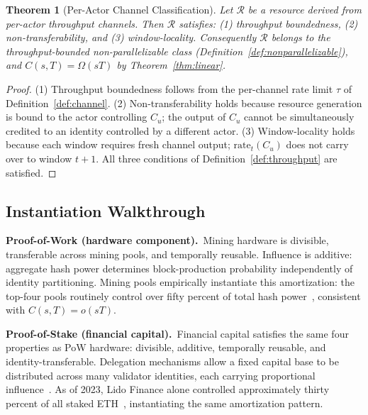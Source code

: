 \documentclass[10pt,journal,compsoc]{IEEEtran}
\newtheorem{theorem}{Theorem}[section]
\theoremstyle{remark}
\begin{document}
	\begin{theorem}[Per-Actor Channel Classification]
		\label{thm:channel}
		Let $\mathcal{R}$ be a resource derived from per-actor
		throughput channels.
		Then $\mathcal{R}$ satisfies:
		(1) throughput boundedness,
		(2) non-transferability, and
		(3) window-locality.
		Consequently $\mathcal{R}$ belongs to the
		throughput-bounded non-parallelizable class
		(Definition~\ref{def:nonparallelizable}), and
		$C(s,T) = \Omega(sT)$ by Theorem~\ref{thm:linear}.
	\end{theorem}
	
	\begin{proof}
		(1) Throughput boundedness follows from the
		per-channel rate limit $\tau$ of
		Definition~\ref{def:channel}.
		(2) Non-transferability holds because resource
		generation is bound to the actor controlling $C_u$;
		the output of $C_u$ cannot be simultaneously
		credited to an identity controlled by a different
		actor.
		(3) Window-locality holds because each window
		requires fresh channel output; $\mathrm{rate}_t(C_u)$
		does not carry over to window $t+1$.
		All three conditions of Definition~\ref{def:throughput}
		are satisfied.
	\end{proof}
	
	\subsection{Instantiation Walkthrough}
	\label{ssec:walkthrough}
	
	\noindent\textbf{Proof-of-Work (hardware component).}\ 
	Mining hardware is divisible, transferable across mining
	pools, and temporally reusable.
	Influence is additive: aggregate hash power determines
	block-production probability independently of identity
	partitioning.
	Mining pools empirically instantiate this amortization:
	the top-four pools routinely control over fifty percent
	of total hash power~\cite{gencer2018decentralization,rosenfeld2011analysis},
	consistent with $C(s,T) = o(sT)$.
	
	\noindent\textbf{Proof-of-Stake (financial capital).}\ 
	Financial capital satisfies the same four properties
	as PoW hardware: divisible, additive, temporally
	reusable, and identity-transferable.
	Delegation mechanisms allow a fixed capital base to
	be distributed across many validator identities, each
	carrying proportional
	influence~\cite{kiayias2017ouroboros,saleh2021blockchain}.
	As of 2023, Lido Finance alone controlled approximately
	thirty percent of all staked
	ETH~\cite{lido2023concentration}, instantiating
	the same amortization pattern.
	
\end{document}
